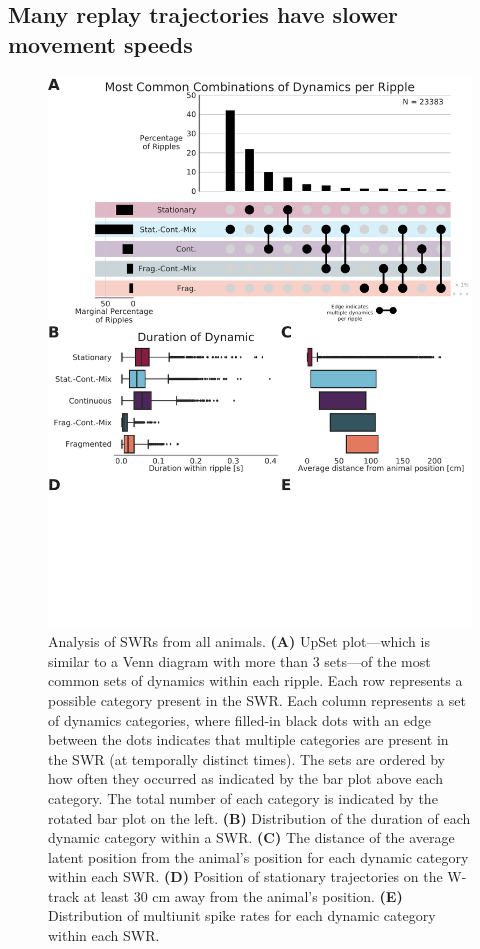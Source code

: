 \documentclass[times, twoside]{zHenriquesLab-StyleBioRxiv}
\begin{document}
\subsection*{Many replay trajectories have slower movement speeds}
\begin{figure}%
\centering
\includegraphics[width=0.80\linewidth]{figures/Figure5/Figure5_v3}
\caption{
Analysis of SWRs from all animals. \textbf{(A)} UpSet plot---which is similar to a Venn diagram with more than 3 sets---of the most common sets of dynamics within each ripple. Each row represents a possible category present in the SWR. Each column represents a set of dynamics categories, where filled-in black dots with an edge between the dots indicates that multiple categories are present in the SWR (at temporally distinct times). The sets are ordered by how often they occurred as indicated by the bar plot above each category. The total number of each category is indicated by the rotated bar plot on the left. \textbf{(B)} Distribution of the duration of each dynamic category within a SWR. \textbf{(C)} The distance of the average latent position from the animal's position for each dynamic category within each SWR. \textbf{(D)} Position of stationary trajectories on the W-track at least 30 cm away from the animal's position. \textbf{(E)} Distribution of multiunit spike rates for each dynamic category within each SWR.
}
\label{5}
\end{figure}
\end{document}
